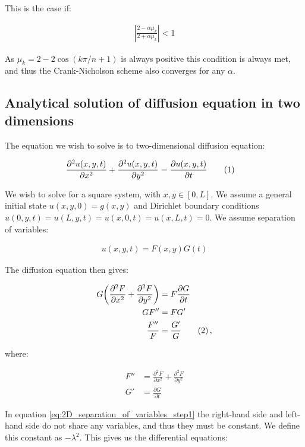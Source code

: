 \documentclass[reprint,english,notitlepage]{revtex4-1}  %
\newcommand\numberthis{\addtocounter{equation}{1}\tag{\theequation}}
\begin{document}
This is the case if:

\begin{align*}
| \frac{2 - \alpha \mu_k}{2 + \alpha \mu_k} | < 1
\end{align*}

As $\mu_k = 2 - 2 \cos(k\pi/n + 1)$ is always positive this condition is always met, and thus the Crank-Nicholson scheme also converges for any $\alpha$. 




\subsection{Analytical solution of diffusion equation in two dimensions} \label{sec:formalism_2D_diff_eq_analytical}

The equation we wish to solve is to two-dimensional diffusion equation:

\begin{align*}
\frac{\partial^2 u(x,y,t)}{\partial x^2} + \frac{\partial^2 u(x,y,t)}{\partial y^2} &= \frac{\partial u(x,y,t)}{\partial t} \numberthis \label{eq:2D_diffusion_equation}
\end{align*}

We wish to solve for a square system, with $x,y \in [0,L]$. We assume a general initial state $u(x,y,0) = g(x,y)$ and Dirichlet boundary conditions $u(0,y,t) = u(L,y,t) = u(x,0,t) = u(x,L,t) = 0$. We assume separation of variables:

\begin{align*}
u(x,y,t) = F(x,y) G(t)
\end{align*}

The diffusion equation then gives:

\begin{align*}
G\bigg( \frac{\partial^2 F}{\partial x^2} + \frac{\partial^2 F}{\partial y^2} \bigg) &= F\frac{\partial G}{\partial t} \\
GF'' &= FG'\\
\frac{F''}{F} &= \frac{G'}{G} \numberthis \label{eq:2D_separation_of_variables_step1} \, ,
\end{align*}

where:

\begin{align*}
F'' &= \frac{\partial^2 F}{\partial x^2} + \frac{\partial^2 F}{\partial y^2} \\
G' &= \frac{\partial G}{\partial t}
\end{align*}

In equation \eqref{eq:2D_separation_of_variables_step1} the right-hand side and left-hand side do not share any variables, and thus they must be constant. We define this constant as $-\lambda^2$. This gives us the differential equations:
\end{document}
